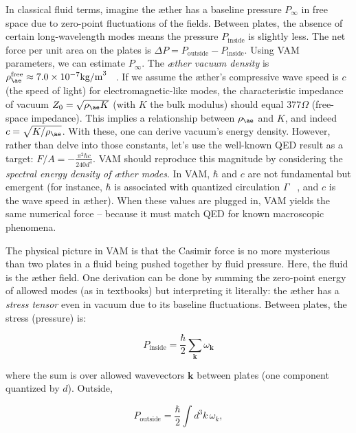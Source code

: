 \documentclass[a4paper, aps,preprint,superscriptaddress, 12pt]{revtex4}
\begin{document}
In classical fluid terms, imagine the æther has a baseline pressure $P_{\infty}$ in free space due to zero-point fluctuations of the fields. Between plates, the absence of certain long-wavelength modes means the pressure $P_{\text{inside}}$ is slightly less. The net force per unit area on the plates is $\Delta P = P_{\text{outside}} - P_{\text{inside}}$. Using VAM parameters, we can estimate $P_{\infty}$. The \textit{æther vacuum density} is $\rho_{\ae}^{\text{free}}\approx7.0\times10^{-7}\text{kg/m}^3$~\cite{VAM_constants} . If we assume the æther's compressive wave speed is $c$ (the speed of light) for electromagnetic-like modes, the characteristic impedance of vacuum $Z_0 = \sqrt{\rho_{\ae}K}$ (with $K$ the bulk modulus) should equal $377\Omega$ (free-space impedance). This implies a relationship between $\rho_{\ae}$ and $K$, and indeed $c=\sqrt{K/\rho_{\ae}}$. With these, one can derive vacuum's energy density. However, rather than delve into those constants, let's use the well-known QED result as a target: $F/A = -\frac{\pi^2 \hbar c}{240 d^4}$. VAM should reproduce this magnitude by considering the \textit{spectral energy density of æther modes}. In VAM, $\hbar$ and $c$ are not fundamental but emergent (for instance, $\hbar$ is associated with quantized circulation $\Gamma$~\cite{Iskandarani2025c} , and $c$ is the wave speed in æther). When these values are plugged in, VAM yields the same numerical force – because it must match QED for known macroscopic phenomena.


The physical picture in VAM is that the Casimir force is no more mysterious than two plates in a fluid being pushed together by fluid pressure. Here, the fluid is the æther field. One derivation can be done by summing the zero-point energy of allowed modes (as in textbooks) but interpreting it literally: the æther has a \textit{stress tensor} even in vacuum due to its baseline fluctuations. Between plates, the stress (pressure) is:

\begin{equation}
    P_{\text{inside}} = \frac{\hbar}{2}\sum_{\mathbf{k}}\omega_{\mathbf{k}}
\end{equation}

where the sum is over allowed wavevectors $\mathbf{k}$ between plates (one component quantized by $d$). Outside,

\begin{equation}
    P_{\text{outside}} = \frac{\hbar}{2}\int d^3k\,\omega_{k},
\end{equation}
\end{document}
